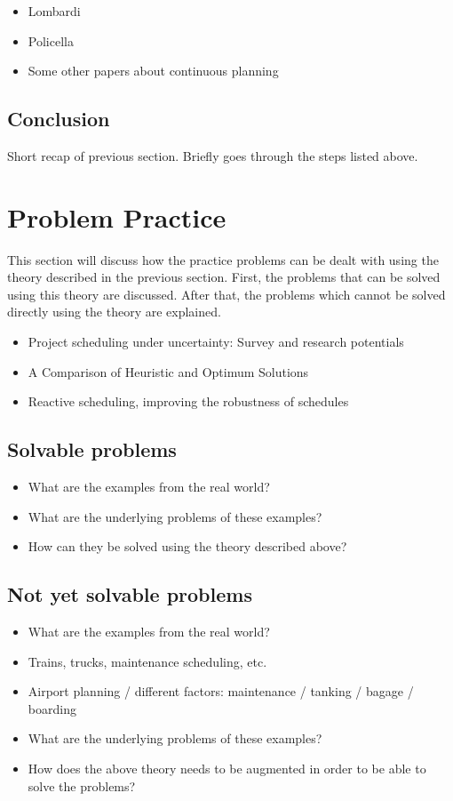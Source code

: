 \documentclass{article}
\begin{document}
\begin{itemize}
\item Lombardi
\item Policella
\item Some other papers about continuous planning
\end{itemize}

\subsection{Conclusion}

Short recap of previous section. Briefly goes through the steps listed above.

\section{Problem Practice}
This section will discuss how the practice problems can be dealt with using the theory described in the previous section. First, the problems that can be solved using this theory are discussed. After that, the problems which cannot be solved directly using the theory are explained.\\

\begin{itemize}
\item Project scheduling under uncertainty: Survey
and research potentials
\item A Comparison of Heuristic and Optimum Solutions
\item Reactive scheduling, improving the robustness of schedules
\end{itemize}

\subsection{Solvable problems}
\begin{itemize}
\item What are the examples from the real world?
\item What are the underlying problems of these examples?
\item How can they be solved using the theory described above?
\end{itemize}

\subsection{Not yet solvable problems}
\begin{itemize}
\item What are the examples from the real world?
\item Trains, trucks, maintenance scheduling, etc.
\item Airport planning / different factors: maintenance / tanking / bagage / boarding
\item What are the underlying problems of these examples?
\item How does the above theory needs to be augmented in order to be able to solve the problems?
\end{itemize}
\end{document}
